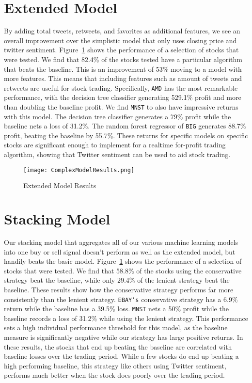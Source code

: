\documentclass[../thesis.tex]{subfiles}
\begin{document}
\section{Extended Model}
By adding total tweets, retweets, and favorites as additional features, we see an overall improvement over the simplistic model that only uses closing price and twitter sentiment. Figure~\ref{complexresults} shows the performance of a selection of stocks that were tested. We find that 82.4\% of the stocks tested have a particular algorithm that beats the baseline. This is an improvement of 53\% moving to a model with more features. This means that including features such as amount of tweets and retweets are useful for stock trading. Specifically, \texttt{AMD} has the most remarkable performance, with the decision tree classifier generating 529.1\% profit and more than doubling the baseline profit. We find \texttt{MNST} to also have impressive returns with this model. The decision tree classifier generates a 79\% profit while the baseline nets a loss of 31.2\%. The random forest regressor of \texttt{BIG} generates 88.7\% profit, beating the baseline by 55.7\%. These returns for specific models on specific stocks are significant enough to implement for a realtime for-profit trading algorithm, showing that Twitter sentiment can be used to aid stock trading. 

\begin{figure}[h]
\centering
\texttt{[image: ComplexModelResults.png]}
\caption{Extended Model Results \label{overflow}}
\label{complexresults}
\end{figure}

\section{Stacking Model}
Our stacking model that aggregates all of our various machine learning models into one buy or sell signal doesn't perform as well as the extended model, but handily beats the basic model. Figure~\ref{complexresults} shows the performance of a selection of stocks that were tested. We find that 58.8\% of the stocks using the conservative strategy beat the baseline, while only 29.4\% of the lenient strategy beat the baseline. These results show how the conservative strategy performs far more consistently than the lenient strategy. \texttt{EBAY's} conservative strategy has a 6.9\% return while the baseline has a 39.5\% loss. \texttt{MNST} nets a 50\% profit while the baseline records a loss of 31.2\% while using the lenient strategy. This performance sets a high individual performance threshold for this model, as the baseline measure is significantly negative while our strategy has large positive returns. In these results, the stocks that end up beating the baseline are correlated with baseline losses over the trading period. While a few stocks do end up beating a high performing baseline, this strategy like others using Twitter sentiment, performs much better when the stock does poorly over the trading period. 
\end{document}
